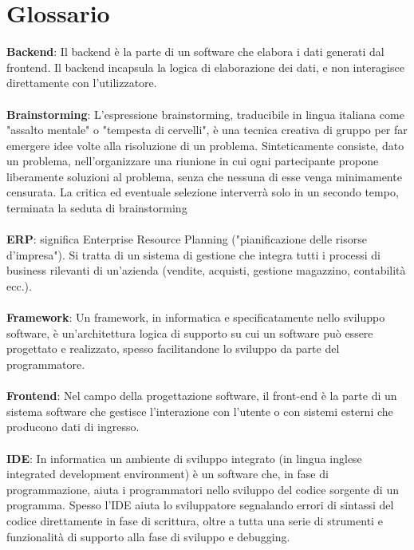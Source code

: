 \chapter*{Glossario}
\label{cap:glossario}

\textbf{Backend}: Il backend è la parte di un software che elabora i dati generati dal frontend. Il backend incapsula la logica di elaborazione dei dati, e non interagisce direttamente con l’utilizzatore.
\\
\\
\textbf{Brainstorming}: L'espressione brainstorming, traducibile in lingua italiana come "assalto mentale" o "tempesta di cervelli", è una tecnica creativa di gruppo per far emergere idee volte alla risoluzione di un problema. Sinteticamente consiste, dato un problema, nell'organizzare una riunione in cui ogni partecipante propone liberamente soluzioni al problema, senza che nessuna di esse venga minimamente censurata. La critica ed eventuale selezione interverrà solo in un secondo tempo, terminata la seduta di brainstorming
\\
\\
\textbf{ERP}: significa Enterprise Resource Planning ("pianificazione delle risorse d'impresa"). Si tratta di un sistema di gestione che integra tutti i processi di business rilevanti di un'azienda (vendite, acquisti, gestione magazzino, contabilità ecc.).
\\
\\
\textbf{Framework}: Un framework, in informatica e specificatamente nello sviluppo software, è un’architettura logica di supporto su cui un software può essere progettato e realizzato, spesso facilitandone lo sviluppo da parte del programmatore.
\\
\\
\textbf{Frontend}: Nel campo della progettazione software, il front-end è la parte di un sistema software che gestisce l’interazione con l’utente o con sistemi esterni che producono dati di ingresso.
\\
\\
\textbf{IDE}: In informatica un ambiente di sviluppo integrato (in lingua inglese integrated development environment) è un software che, in fase di programmazione, aiuta i programmatori nello sviluppo del codice sorgente di un programma. Spesso l’IDE aiuta lo sviluppatore segnalando errori di sintassi del codice direttamente in fase di scrittura, oltre a tutta una serie di strumenti e funzionalità di supporto alla fase di sviluppo e debugging.
\\
